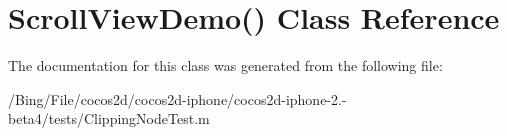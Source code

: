 \hypertarget{interface_scroll_view_demo_07_08}{\section{Scroll\-View\-Demo() Class Reference}
\label{interface_scroll_view_demo_07_08}
}


The documentation for this class was generated from the following file\-:\begin{DoxyCompactItemize}
\item 
/\-Bing/\-File/cocos2d/cocos2d-\/iphone/cocos2d-\/iphone-\/2.-\/beta4/tests/Clipping\-Node\-Test.\-m\end{DoxyCompactItemize}
